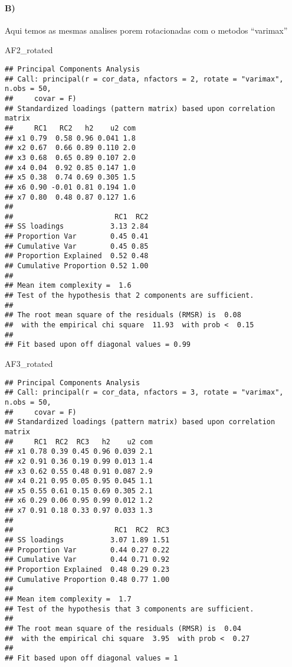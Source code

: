 \documentclass[
]{article}
\newenvironment{Shaded}{\begin{snugshade}}{\end{snugshade}}
\newcommand{\NormalTok}[1]{#1}
\begin{document}
\newpage

\hypertarget{b-2}{%
\paragraph{B)}\label{b-2}}

Aqui temos as mesmas analises porem rotacionadas com o metodos
``varimax''

\begin{Shaded}
\begin{Highlighting}[]
\NormalTok{AF2\_rotated}
\end{Highlighting}
\end{Shaded}

\begin{verbatim}
## Principal Components Analysis
## Call: principal(r = cor_data, nfactors = 2, rotate = "varimax", n.obs = 50, 
##     covar = F)
## Standardized loadings (pattern matrix) based upon correlation matrix
##     RC1   RC2   h2    u2 com
## x1 0.79  0.58 0.96 0.041 1.8
## x2 0.67  0.66 0.89 0.110 2.0
## x3 0.68  0.65 0.89 0.107 2.0
## x4 0.04  0.92 0.85 0.147 1.0
## x5 0.38  0.74 0.69 0.305 1.5
## x6 0.90 -0.01 0.81 0.194 1.0
## x7 0.80  0.48 0.87 0.127 1.6
## 
##                        RC1  RC2
## SS loadings           3.13 2.84
## Proportion Var        0.45 0.41
## Cumulative Var        0.45 0.85
## Proportion Explained  0.52 0.48
## Cumulative Proportion 0.52 1.00
## 
## Mean item complexity =  1.6
## Test of the hypothesis that 2 components are sufficient.
## 
## The root mean square of the residuals (RMSR) is  0.08 
##  with the empirical chi square  11.93  with prob <  0.15 
## 
## Fit based upon off diagonal values = 0.99
\end{verbatim}

\newpage

\begin{Shaded}
\begin{Highlighting}[]
\NormalTok{AF3\_rotated}
\end{Highlighting}
\end{Shaded}

\begin{verbatim}
## Principal Components Analysis
## Call: principal(r = cor_data, nfactors = 3, rotate = "varimax", n.obs = 50, 
##     covar = F)
## Standardized loadings (pattern matrix) based upon correlation matrix
##     RC1  RC2  RC3   h2    u2 com
## x1 0.78 0.39 0.45 0.96 0.039 2.1
## x2 0.91 0.36 0.19 0.99 0.013 1.4
## x3 0.62 0.55 0.48 0.91 0.087 2.9
## x4 0.21 0.95 0.05 0.95 0.045 1.1
## x5 0.55 0.61 0.15 0.69 0.305 2.1
## x6 0.29 0.06 0.95 0.99 0.012 1.2
## x7 0.91 0.18 0.33 0.97 0.033 1.3
## 
##                        RC1  RC2  RC3
## SS loadings           3.07 1.89 1.51
## Proportion Var        0.44 0.27 0.22
## Cumulative Var        0.44 0.71 0.92
## Proportion Explained  0.48 0.29 0.23
## Cumulative Proportion 0.48 0.77 1.00
## 
## Mean item complexity =  1.7
## Test of the hypothesis that 3 components are sufficient.
## 
## The root mean square of the residuals (RMSR) is  0.04 
##  with the empirical chi square  3.95  with prob <  0.27 
## 
## Fit based upon off diagonal values = 1
\end{verbatim}
\end{document}
